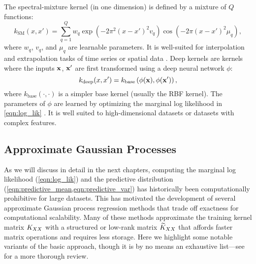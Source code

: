 The spectral-mixture kernel (in one dimension) is defined by a mixture of $Q$ functions:
%
\[
  k_\text{SM} (x, x') = \sum_{q=1}^Q w_q
    \exp \left( -2 \pi^2 (x - x')^2 v_q \right)
    \cos \left( -2 \pi (x - x')^2 \mu_q \right),
\]
%
where $w_q$, $v_q$, and $\mu_q$ are learnable parameters.
It is well-suited for interpolation and extrapolation tasks of time series or spatial data \cite{wilson2013gaussian}.
Deep kernels \cite{wilson2016deep,wilson2016stochastic,calandra2016manifold} are kernels where the inputs $\mathbf{x}$, $\mathbf{x}'$ are first transformed using a deep neural network $\phi$:
%
\[
  k_\text{deep} (x, x') = k_\text{base} \left( \phi(\mathbf{x}), \phi(\mathbf{x}') \right),
\]
where $k_\text{base}(\cdot, \cdot)$ is a simpler base kernel (usually the RBF kernel).
The parameters of $\phi$ are learned by optimizing the marginal log likelihood in \cref{eqn:log_lik} \cite{wilson2016deep}.
It is well suited to high-dimensional datasets or datasets with complex features.







\subsection{Approximate Gaussian Processes}
\label{sec:approx_gps}

As we will discuss in detail in the next chapters, computing the marginal log likelihood (\cref{eqn:log_lik}) and the predictive distribution (\cref{eqn:predictive_mean,eqn:predictive_var}) has historically been computationally prohibitive for large datasets.
This has motivated the development of several approximate Gaussian process regression methods \citep[e.g.][]{quinonero2005unifying,snelson2006sparse,rahimi2008random,titsias2009variational,hensman2013gaussian,wilson2015kernel,izmailov2018scalable,gardner2018product,evans2018scalable} that trade off exactness for computational scalability.
Many of these methods approximate the training kernel matrix $K_{XX}$ with a structured or low-rank matrix $\widetilde{K}_{XX}$ that affords faster matrix operations and requires less storage.
Here we highlight some notable variants of the basic approach, though it is by no means an exhaustive list---see \cite{liu2018gaussian} for a more thorough review.


